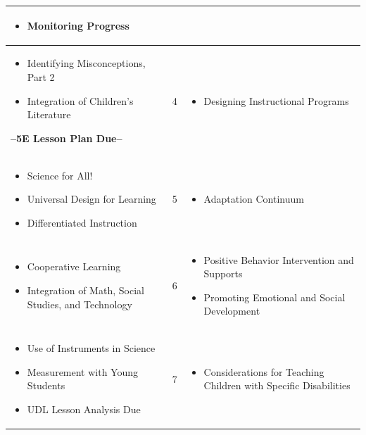 \documentclass[11.5pt]{sig-alternate} %
\begin{document}
\begin{large}
\begin{table}[htbp]
\begin{tabular}{|l|c|l|}
\begin{itemize}[noitemsep, topsep=0pt]
    \item Monitoring Progress
\end{itemize} \\ \hline
\begin{itemize}[noitemsep, topsep=0pt]
    \item Identifying Misconceptions, Part 2
    \item Integration of Children’s Literature
\end{itemize}
\textbf{--5E Lesson Plan Due--} & 4 & \begin{itemize}[noitemsep, topsep=0pt]
    \item Designing Instructional Programs
\end{itemize} \\ \hline
\begin{itemize}[noitemsep, topsep=0pt]
    \item Science for All!
    \item Universal Design for Learning
    \item Differentiated Instruction
\end{itemize} & 5 & \begin{itemize}[noitemsep, topsep=0pt]
    \item Adaptation Continuum
\end{itemize} \\ \hline
\begin{itemize}[noitemsep, topsep=0pt]
    \item Cooperative Learning
    \item Integration of Math, Social Studies, and Technology
\end{itemize} & 6 & \begin{itemize}[noitemsep, topsep=0pt]
\item Positive Behavior Intervention and Supports
\item Promoting Emotional and Social Development
\end{itemize} \\ \hline
\begin{itemize}[noitemsep, topsep=0pt]
    \item Use of Instruments in Science
    \item Measurement with Young Students
    \item UDL Lesson Analysis Due
\end{itemize} & 7 & \begin{itemize}[noitemsep, topsep=0pt]
    \item Considerations for Teaching Children with Specific Disabilities

\end{itemize}
\end{tabular}
\end{table}
\end{large}
\end{document}
